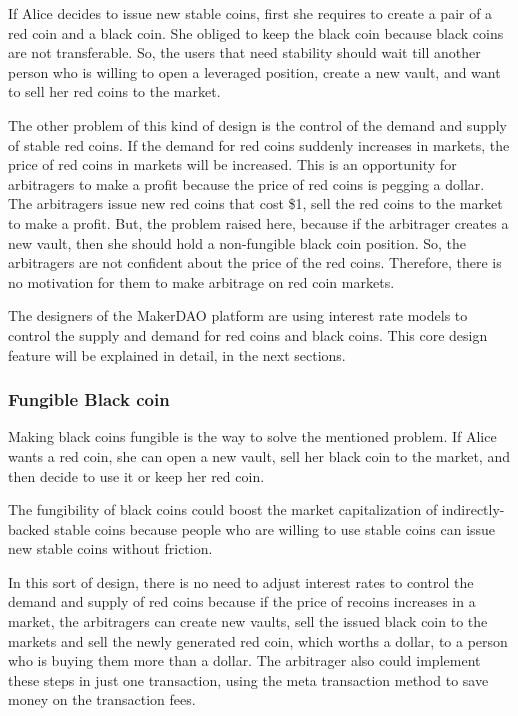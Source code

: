 If Alice decides to issue new stable coins, first she requires to create a pair of a red coin and a black coin. She obliged to keep the black coin because black coins are not transferable. So, the users that need stability should wait till another person who is willing to open a leveraged position, create a new vault, and want to sell her red coins to the market.

The other problem of this kind of design is the control of the demand and supply of stable red coins. If the demand for red coins suddenly increases in markets, the price of red coins in markets will be increased. This is an opportunity for arbitragers to make a profit because the price of red coins is pegging a dollar. The arbitragers issue new red coins that cost \$1, sell the red coins to the market to make a profit. But, the problem raised here, because if the arbitrager creates a new vault, then she should hold a non-fungible black coin position. So, the arbitragers are not confident about the price of the red coins. Therefore, there is no motivation for them to make arbitrage on red coin markets.
 
The designers of the MakerDAO platform are using interest rate models to control the supply and demand for red coins and black coins. This core design feature will be explained in detail, in the next sections.

\subsubsection{Fungible Black coin}

Making black coins fungible is the way to solve the mentioned problem. If Alice wants a red coin, she can open a new vault, sell her black coin to the market, and then decide to use it or keep her red coin.

The fungibility of black coins could boost the market capitalization of indirectly-backed stable coins because people who are willing to use stable coins can issue new stable coins without friction.

In this sort of design, there is no need to adjust interest rates to control the demand and supply of red coins because if the price of recoins increases in a market, the arbitragers can create new vaults, sell the issued black coin to the markets and sell the newly generated red coin, which worths a dollar, to a person who is buying them more than a dollar. The arbitrager also could implement these steps in just one transaction, using the meta transaction method to save money on the transaction fees.

